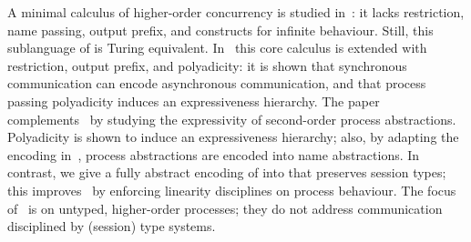 A minimal calculus of higher-order concurrency is studied in~\cite{DBLP:journals/iandc/LanesePSS11}: it lacks restriction,  name passing, output prefix, %
and constructs for infinite behaviour. 
Still, this  sublanguage of \HO is Turing equivalent.
In~\cite{DBLP:conf/icalp/LanesePSS10}
this core calculus  is extended with restriction,
output prefix, and polyadicity: it is shown that 
synchronous communication can encode asynchronous communication, %
and that process passing polyadicity induces an expressiveness  hierarchy. %
The paper~\cite{DBLP:conf/wsfm/XuYL13} 
complements~\cite{DBLP:conf/icalp/LanesePSS10} 
by studying the expressivity %
of 
second-order process abstractions.
Polyadicity is shown to induce an expressiveness hierarchy; 
also,
by adapting the encoding in~\cite{SangiorgiD:expmpa},
process abstractions are encoded into name abstractions.
In contrast, we 
give a fully abstract encoding of
 \PHOpp into \HO that preserves session types; this improves~\cite{DBLP:conf/icalp/LanesePSS10,DBLP:conf/wsfm/XuYL13}   
by enforcing linearity disciplines on process behaviour.
The focus of~\cite{DBLP:conf/icalp/LanesePSS10,XuActa2012,DBLP:conf/wsfm/XuYL13,DBLP:journals/corr/XuYL15} is on 
untyped, higher-order processes; they
do not address communication disciplined by 
(session) type systems.



